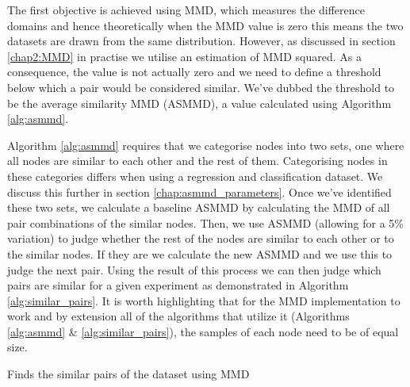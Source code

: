 \documentclass{mpaper}
\begin{document}
The first objective is achieved using MMD, which measures the difference domains and hence theoretically when the MMD value is zero this means the two datasets are drawn from the same distribution. However, as discussed in section \ref{chap2:MMD} in practise we utilise an estimation of MMD squared. As a consequence, the value is not actually zero and we need to define a threshold below which a pair would be considered similar. We've dubbed the threshold to be the average similarity MMD (ASMMD), a value calculated using Algorithm \ref{alg:asmmd}. 

Algorithm \ref{alg:asmmd} requires that we categorise nodes into two sets, one where all nodes are similar to each other and the rest of them. Categorising nodes in these categories differs when using a regression and classification dataset. We discuss this further in section \ref{chap:asmmd_parameters}. Once we've identified these two sets, we calculate a baseline ASMMD by calculating the MMD of all pair combinations of the similar nodes. Then, we use ASMMD (allowing for a 5\% variation) to judge whether the rest of the nodes are similar to each other or to the similar nodes. If they are we calculate the new ASMMD and we use this to judge the next pair. Using the result of this process we can then judge which pairs are similar for a given experiment as demonstrated in Algorithm  \ref{alg:similar_pairs}. It is worth highlighting that for the MMD implementation to work and by extension all of the algorithms that utilize it (Algorithms \ref{alg:asmmd} \& \ref{alg:similar_pairs}), the samples of each node need to be of equal size.

\begin{algorithm}
    \DontPrintSemicolon
    \caption{Finds the similar pairs of the dataset using MMD
    }\label{alg:similar_pairs}
    
    
\end{algorithm}
\end{document}
